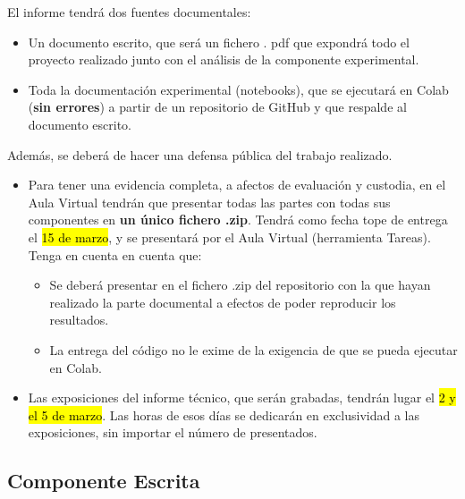 \documentclass[a4paper, 11pt]{article}
\begin{document}
El informe tendrá dos fuentes documentales:
\begin{itemize}
\item Un documento escrito, que será un fichero . pdf que expondrá todo el proyecto realizado junto con el análisis de la componente experimental.

\item Toda la  documentación experimental (notebooks), que se ejecutará en Colab (\textbf{sin errores}) a partir de un repositorio de GitHub y que respalde al documento escrito.

\end{itemize}

Además, se deberá de hacer una defensa pública del trabajo realizado.


\begin{importantbox}
\begin{itemize}

\item Para tener una evidencia completa, a afectos de evaluación y custodia, en el Aula Virtual tendrán que presentar todas las partes con todas sus componentes en \textbf{un único fichero .zip}. Tendrá como fecha tope de entrega el \hl{15 de marzo}, y se presentará por el Aula Virtual (herramienta Tareas). Tenga en cuenta en cuenta que:
\begin{itemize}
\item Se deberá presentar en el fichero .zip  del repositorio con la que hayan realizado la parte documental a efectos de poder reproducir los resultados.

\item La entrega del código no le exime de la exigencia de que se pueda ejecutar en Colab.  
\end{itemize}


\item Las exposiciones del informe técnico, que serán grabadas, tendrán lugar el \hl{2 y el 5 de marzo}. Las horas de esos días se dedicarán en exclusividad a las exposiciones, sin importar el número de presentados.

\end{itemize}
\end{importantbox}




\subsection{Componente Escrita}
\end{document}
